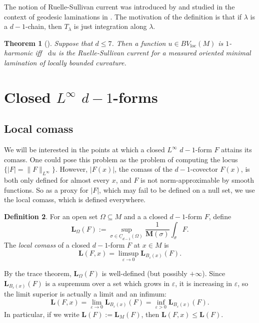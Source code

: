\documentclass[reqno,11pt]{amsart}
\newcommand*\dif{\mathop{}\!\mathrm{d}}
\newcommand{\Chain}{\underline C}
\newcommand{\Mass}{\mathbf M}
\newcommand{\Comass}{\mathbf L}
\newcommand{\dfn}[1]{\emph{#1}\index{#1}}
\newcommand{\loc}{\mathrm{loc}}
\newtheorem{theorem}{Theorem}[section]
\theoremstyle{definition}
\newtheorem{definition}[theorem]{Definition}
\numberwithin{equation}{section}
\begin{document}
The notion of Ruelle-Sullivan current  was introduced by \cite{Ruelle75} and studied in the context of geodesic laminations in \cite[\S8]{daskalopoulos2020transverse}.
The motivation of the definition is that if $\lambda$ is a $d - 1$-chain, then $T_\lambda$ is just integration along $\lambda$.

\begin{theorem}[{\cite[Theorem B]{BackusCML}}]\label{1 harmonic is MOML}
Suppose that $d \leq 7$.
Then a function $u \in BV_\loc(M)$ is $1$-harmonic iff $\dif u$ is the Ruelle-Sullivan current for a measured oriented minimal lamination of locally bounded curvature.
\end{theorem}




\section{\texorpdfstring{Closed $L^\infty$ $d - 1$-forms}{Closed (d - 1)-forms of finite comass}}\label{comass sec}
\subsection{Local comass}
We will be interested in the points at which a closed $L^\infty$ $d - 1$-form $F$ attains its comass.
One could pose this problem as the problem of computing the locus $\{|F| = \|F\|_{L^\infty}\}$.
However, $|F(x)|$, the comass of the $d - 1$-covector $F(x)$, is both only defined for almost every $x$, and $F$ is not norm-approximable by smooth functions.
So as a proxy for $|F|$, which may fail to be defined on a null set, we use the local comass, which is defined everywhere.

\begin{definition}
For an open set $\Omega \subseteq M$ and a a closed $d - 1$-form $F$, define 
$$\Comass_\Omega(F) := \sup_{\sigma \in \Chain_{d - 1}(\Omega)} \frac{1}{\Mass(\sigma)} \int_\sigma F.$$
The \dfn{local comass} of a closed $d - 1$-form $F$ at $x \in M$ is 
$$\Comass(F, x) = \limsup_{\varepsilon \to 0} \Comass_{B_\varepsilon(x)}(F).$$
\end{definition}

By the trace theorem, $\Comass_\Omega(F)$ is well-defined (but possibly $+\infty$).
Since $\Comass_{B_\varepsilon(x)}(F)$ is a supremum over a set which grows in $\varepsilon$, it is increasing in $\varepsilon$, so the limit superior is actually a limit and an infimum:
$$\Comass(F, x) = \lim_{\varepsilon \to 0} \Comass_{B_\varepsilon(x)}(F) = \inf_{\varepsilon > 0} \Comass_{B_\varepsilon(x)}(F).$$
In particular, if we write $\Comass(F) := \Comass_M(F)$, then $\Comass(F, x) \leq \Comass(F)$.
\end{document}
